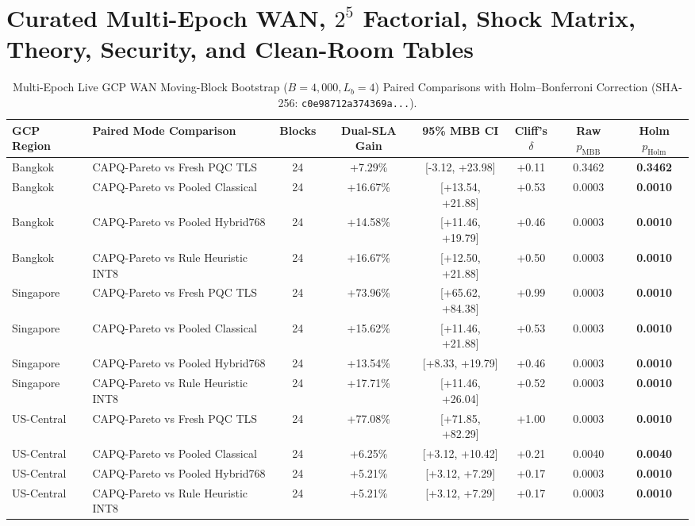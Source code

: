 \documentclass[10pt,journal,compsoc]{IEEEtran}
\begin{document}
\section{Curated Multi-Epoch WAN, $2^5$ Factorial, Shock Matrix, Theory, Security, and Clean-Room Tables}
\begin{table}[!htbp]\centering\scriptsize
\caption{Multi-Epoch Live GCP WAN Moving-Block Bootstrap ($B=4,000, L_b=4$) Paired Comparisons with Holm--Bonferroni Correction (SHA-256: \texttt{c0e98712a374369a...}).}
\begin{tabular}{@{}llcccccc@{}}\toprule
\textbf{GCP Region} & \textbf{Paired Mode Comparison} & \textbf{Blocks} & \textbf{Dual-SLA Gain} & \textbf{95\% MBB CI} & \textbf{Cliff's $\delta$} & \textbf{Raw $p_{\mathrm{MBB}}$} & \textbf{Holm $p_{\mathrm{Holm}}$} \\\midrule
Bangkok & CAPQ-Pareto vs Fresh PQC TLS & 24 & +7.29\% & [-3.12, +23.98] & +0.11 & 0.3462 & \textbf{0.3462} \\
Bangkok & CAPQ-Pareto vs Pooled Classical & 24 & +16.67\% & [+13.54, +21.88] & +0.53 & 0.0003 & \textbf{0.0010} \\
Bangkok & CAPQ-Pareto vs Pooled Hybrid768 & 24 & +14.58\% & [+11.46, +19.79] & +0.46 & 0.0003 & \textbf{0.0010} \\
Bangkok & CAPQ-Pareto vs Rule Heuristic INT8 & 24 & +16.67\% & [+12.50, +21.88] & +0.50 & 0.0003 & \textbf{0.0010} \\
\midrule
Singapore & CAPQ-Pareto vs Fresh PQC TLS & 24 & +73.96\% & [+65.62, +84.38] & +0.99 & 0.0003 & \textbf{0.0010} \\
Singapore & CAPQ-Pareto vs Pooled Classical & 24 & +15.62\% & [+11.46, +21.88] & +0.53 & 0.0003 & \textbf{0.0010} \\
Singapore & CAPQ-Pareto vs Pooled Hybrid768 & 24 & +13.54\% & [+8.33, +19.79] & +0.46 & 0.0003 & \textbf{0.0010} \\
Singapore & CAPQ-Pareto vs Rule Heuristic INT8 & 24 & +17.71\% & [+11.46, +26.04] & +0.52 & 0.0003 & \textbf{0.0010} \\
\midrule
US-Central & CAPQ-Pareto vs Fresh PQC TLS & 24 & +77.08\% & [+71.85, +82.29] & +1.00 & 0.0003 & \textbf{0.0010} \\
US-Central & CAPQ-Pareto vs Pooled Classical & 24 & +6.25\% & [+3.12, +10.42] & +0.21 & 0.0040 & \textbf{0.0040} \\
US-Central & CAPQ-Pareto vs Pooled Hybrid768 & 24 & +5.21\% & [+3.12, +7.29] & +0.17 & 0.0003 & \textbf{0.0010} \\
US-Central & CAPQ-Pareto vs Rule Heuristic INT8 & 24 & +5.21\% & [+3.12, +7.29] & +0.17 & 0.0003 & \textbf{0.0010} \\
\bottomrule\end{tabular}\end{table}
\end{document}
